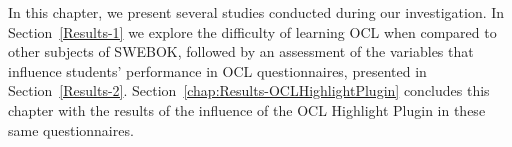 {In this chapter, we present several studies conducted during our investigation. In Section~\ref{Results-1} we explore the difficulty of learning OCL when compared to other subjects of SWEBOK, followed by an assessment of the variables that influence students' performance in OCL questionnaires, presented in Section~\ref{Results-2}. Section~\ref{chap:Results-OCLHighlightPlugin} concludes this chapter with the results of the influence of the OCL Highlight Plugin in these same questionnaires.}

